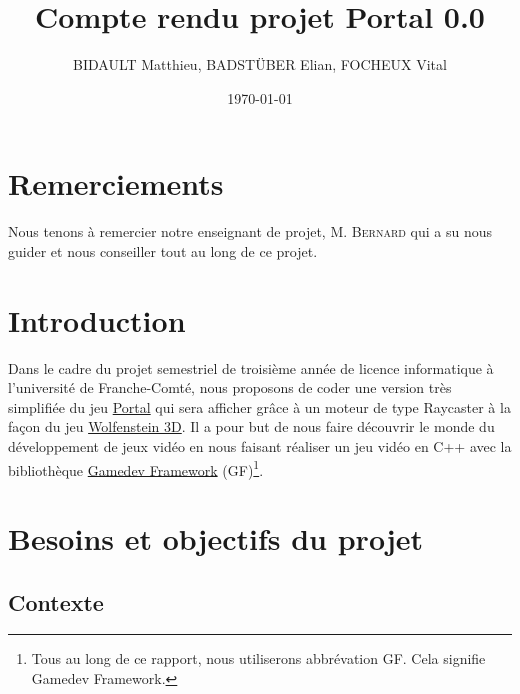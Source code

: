 \documentclass[12pt]{report}
\title{Compte rendu projet Portal 0.0}
\author{BIDAULT Matthieu, BADSTÜBER Elian, FOCHEUX Vital}
\date{\today}
\begin{document}
\maketitle

\section*{Remerciements}

Nous tenons à remercier notre enseignant de projet, M. \textsc{Bernard} 
qui a su nous guider et nous conseiller tout au long de ce projet.


\tableofcontents

\section{Introduction}

Dans le cadre du projet semestriel de troisième année de licence
informatique à l'université de Franche-Comté, nous proposons de coder
une version très simplifiée du jeu \href{https://fr.wikipedia.org/wiki/Portal_(jeu_vid%C3%A9o)}{Portal}\cite{Portal}
qui sera afficher grâce à un moteur de type Raycaster à la façon du jeu
\href{https://fr.wikipedia.org/wiki/Wolfenstein_3D}{Wolfenstein 3D}\cite{Wolfenstein3D}.
Il a pour but de nous faire découvrir le monde du développement de jeux 
vidéo en nous faisant réaliser un jeu vidéo en C++ avec la bibliothèque 
\href{https://gamedevframework.github.io/}{Gamedev Framework} (GF\cite{GF})\footnote{Tous au long de ce rapport, nous utiliserons abbrévation GF.
Cela signifie Gamedev Framework.}.


\section{Besoins et objectifs du projet}
\subsection{Contexte}
\end{document}

